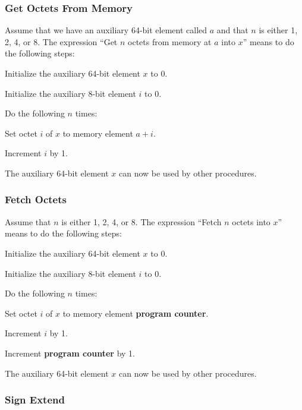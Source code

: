 \documentclass[a4paper,12pt]{article}
\newcommand{\PC}{\textbf{program counter}\xspace}
\begin{document}
\subsubsection{Get Octets From Memory}

Assume that we have an auxiliary 64-bit element called $a$ and that $n$ is either 1, 2, 4, or 8.
The expression ``Get $n$ octets from memory at $a$ into $x$'' means to do the following steps:
\begin{stepnumbers}
\item Initialize the auxiliary 64-bit element $x$ to 0.
\item Initialize the auxiliary 8-bit element $i$ to 0.
\item Do the following $n$ times:
  \begin{stepletters}
  \item Set octet $i$ of $x$ to memory element $a+i$.
  \item Increment $i$ by 1.
  \end{stepletters}
\end{stepnumbers}
The auxiliary 64-bit element $x$ can now be used by other procedures.

\subsubsection{Fetch Octets}

Assume that $n$ is either 1, 2, 4, or 8.
The expression ``Fetch $n$ octets into $x$'' means to do the following steps:
\begin{stepnumbers}
\item Initialize the auxiliary 64-bit element $x$ to 0.
\item Initialize the auxiliary 8-bit element $i$ to 0.
\item Do the following $n$ times:
  \begin{stepletters}
  \item Set octet $i$ of $x$ to memory element \PC.
  \item Increment $i$ by 1.
  \item Increment \PC by 1.
  \end{stepletters}
\end{stepnumbers}
The auxiliary 64-bit element $x$ can now be used by other procedures.

\subsubsection{Sign Extend}
\end{document}
